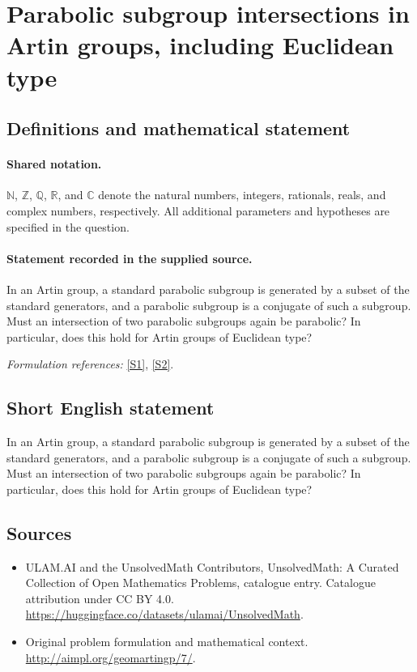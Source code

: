 \documentclass[11pt]{article}
\newcommand{\sref}[2]{\hyperlink{source:#1:#2}{[S#2]}}
\begin{document}
\section{Parabolic subgroup intersections in Artin groups, including Euclidean type}\label{statement}

\subsection{Definitions and mathematical statement}

\paragraph{Shared notation.}$\mathbb N$, $\mathbb Z$, $\mathbb Q$, $\mathbb R$, and $\mathbb C$ denote the natural numbers, integers, rationals, reals, and complex numbers, respectively. All additional parameters and hypotheses are specified in the question.


\paragraph{Statement recorded in the supplied source.}
In an Artin group, a standard parabolic subgroup is generated by a subset of the standard generators, and a parabolic subgroup is a conjugate of such a subgroup. Must an intersection of two parabolic subgroups again be parabolic? In particular, does this hold for Artin groups of Euclidean type?
\par\smallskip\textit{Formulation references:} \sref{statement}{1}, \sref{statement}{2}.
\subsection{Short English statement}
In an Artin group, a standard parabolic subgroup is generated by a subset of the standard generators, and a parabolic subgroup is a conjugate of such a subgroup. Must an intersection of two parabolic subgroups again be parabolic? In particular, does this hold for Artin groups of Euclidean type?
\subsection{Sources}
\begin{itemize}
\item[\hypertarget{source:statement:1}{S1}] ULAM.AI and the UnsolvedMath Contributors, UnsolvedMath: A Curated Collection of Open Mathematics Problems, catalogue entry. Catalogue attribution under CC BY 4.0.
\url{https://huggingface.co/datasets/ulamai/UnsolvedMath}.
\item[\hypertarget{source:statement:2}{S2}] Original problem formulation and mathematical context.
\url{http://aimpl.org/geomartingp/7/}.
\end{itemize}
\label{end:statement}
\end{document}
